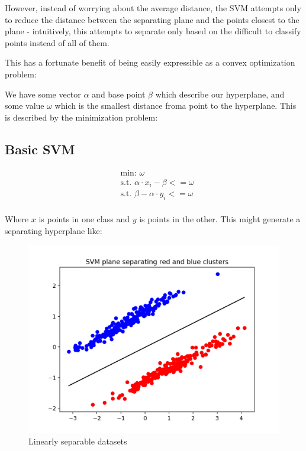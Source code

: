 \documentclass[]{article}
\begin{document}
However, instead of worrying about the average distance, the SVM attempts only to reduce the distance between
the separating plane and the points closest to the plane - intuitively, this attempts to separate only based on the difficult to classify points instead of all of them.

This has a fortunate benefit of being easily expressible as a convex optimization problem:

We have some vector $\alpha$ and base point $\beta$ which describe our hyperplane, and some value $\omega$ which is the smallest distance froma point to the hyperplane. This is described by the minimization problem:

\subsection{Basic SVM}

\begin{equation}
\begin{split}
&\text{min: } \omega
\\
&\text{s.t. } \alpha \cdot x_i - \beta <= \omega
\\
&\text{s.t. } \beta - \alpha \cdot y_i <= \omega
\\
\end{split}
\end{equation}

Where $x$ is points in one class and $y$ is points in the other. This might generate a separating hyperplane like:

\begin{figure}[H]
	\includegraphics[width=\linewidth]{svm_low_var.png}
	\caption{Linearly separable datasets}
\end{figure}
\end{document}
